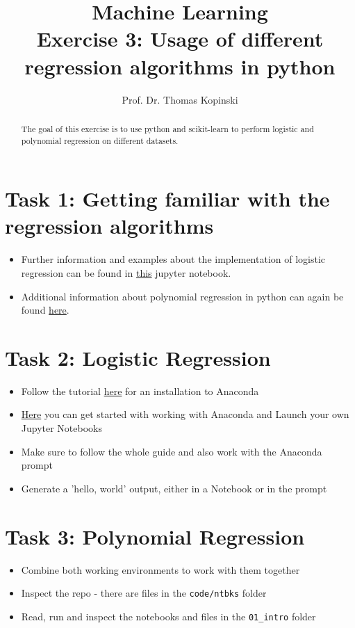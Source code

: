 \documentclass{article}
\title{Machine Learning \\ Exercise 3: Usage of different regression algorithms in python}
\author{Prof. Dr. Thomas Kopinski}
\begin{document}
\maketitle

\begin{abstract}
The goal of this exercise is to use python and scikit-learn to perform logistic and polynomial regression on different datasets.
\end{abstract}

\section*{Task 1: Getting familiar with the regression algorithms}

\begin{itemize}
    \item Further information and examples about the implementation of logistic regression can be found in  \href{https://github.com/rasbt/machine-learning-book/blob/main/ch03/ch03.ipynb}{this} jupyter notebook.
    \item Additional information about polynomial regression in python can again be found \href{https://github.com/DataScienceLabFHSWF/machine-learning-book/blob/main/notebooks/ch09/ch09.ipynb}{here}.
\end{itemize}

\section*{Task 2: Logistic Regression}

\begin{itemize}
    \item Follow the tutorial \href{https://docs.anaconda.com/anaconda/install/index.html}{here} for an installation to Anaconda
    \item \href{https://docs.anaconda.com/anaconda/user-guide/getting-started/}{Here} you can get started with working with Anaconda and Launch your own Jupyter Notebooks
    \item Make sure to follow the whole guide and also work with the Anaconda prompt
    \item Generate a 'hello, world' output, either in a Notebook or in the prompt
\end{itemize}

\section*{Task 3: Polynomial Regression}

\begin{itemize}
    \item Combine both working environments to work with them together
    \item Inspect the repo - there are files in the \verb+code/ntbks+  folder
    \item Read, run and inspect the notebooks and files in the \verb+01_intro+ folder

\end{itemize}

%
%
\end{document}
